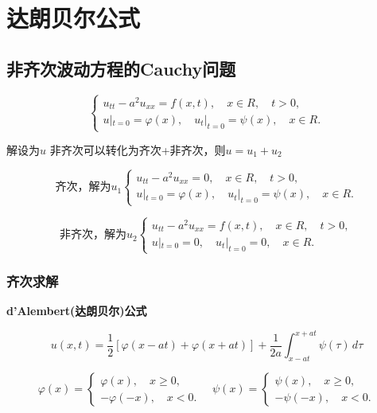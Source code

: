 \section{达朗贝尔公式}

\subsection{非齐次波动方程的Cauchy问题}

\[
\left\{
\begin{aligned}
u_{tt} - a^2 u_{xx} = f(x,t), \quad x \in R , \quad t > 0, \\
u|_{t=0} = \varphi (x), \quad u_t|_{t=0} = \psi (x), \quad x \in R.
\end{aligned}
\right.
\]

解设为$u$
非齐次可以转化为齐次+非齐次，则$u=u_1+u_2$



\[
\textbf{齐次，解为$u_1$}
\left\{
\begin{aligned}
u_{tt} - a^2 u_{xx} = 0, \quad x \in R, \quad t > 0, \\
u|_{t=0} = \varphi (x), \quad u_t|_{t=0} = \psi (x), \quad x \in R.
\end{aligned}
\right.
\]



\[
\textbf{非齐次，解为$u_2$}
\left\{
\begin{aligned}
u_{tt} - a^2 u_{xx} = f(x,t), \quad x \in R, \quad t > 0, \\
u|_{t=0} = 0, \quad u_t|_{t=0} = 0, \quad x \in R.
\end{aligned}
\right.
\]

\subsubsection{齐次求解}

\textbf{d'Alembert(达朗贝尔)公式}

\[
u(x, t) = \frac{1}{2} \left[ \varphi (x - at) + \varphi (x + at) \right] + \frac{1}{2a} \int_{x - at}^{x + at} \psi (\tau ) \, d\tau 
\]

\[
\varphi (x) = 
\left\{
\begin{aligned}
\varphi (x), \quad x \geq 0, \\
-\varphi (-x), \quad x < 0.
\end{aligned}
\right.
\quad
\psi (x) = 
\left\{
\begin{aligned}
\psi (x), \quad x \geq 0, \\
-\psi (-x), \quad x < 0.
\end{aligned}
\right.
\]

